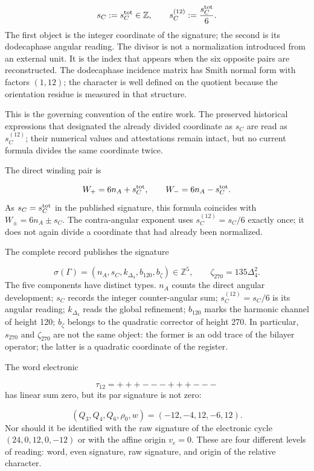 \[
s_C:=s_C^{\rm tot}\in\mathbb Z,
\qquad
s_C^{(12)}:=\frac{s_C^{\rm tot}}6.
\]
The first object is the integer coordinate of the signature; the second is its dodecaphase angular reading. The divisor is not a normalization introduced from an external unit. It is the index that appears when the six opposite pairs are reconstructed. The dodecaphase incidence matrix has Smith normal form with factors \((1,12)\); the character is well defined on the quotient because the orientation residue is measured in that structure.

This is the governing convention of the entire work. The preserved historical expressions that designated the already divided coordinate as \(s_C\) are read as \(s_C^{(12)}\); their numerical values and attestations remain intact, but no current formula divides the same coordinate twice.

The direct winding pair is

\[
W_+=6n_A+s_C^{\rm tot},
\qquad
W_-=6n_A-s_C^{\rm tot}.
\]
As \(s_C=s_C^{\rm tot}\) in the published signature, this formula coincides with \(W_\pm=6n_A\pm s_C\). The contra-angular exponent uses \(s_C^{(12)}=s_C/6\) exactly once; it does not again divide a coordinate that had already been normalized.

The complete record publishes the signature

\[
\sigma(\Gamma)=
(n_A,s_C,k_{\Delta_4},b_{120},b_\zeta)\in\mathbb Z^5,
\qquad
\zeta_{270}=135\Delta_4^2.
\]
The five components have distinct types. \(n_A\) counts the direct angular development; \(s_C\) records the integer counter-angular sum; \(s_C^{(12)}=s_C/6\) is its angular reading; \(k_{\Delta_4}\) reads the global refinement; \(b_{120}\) marks the harmonic channel of height 120; \(b_\zeta\) belongs to the quadratic corrector of height 270. In particular, \(s_{270}\) and \(\zeta_{270}\) are not the same object: the former is an odd trace of the bilayer operator; the latter is a quadratic coordinate of the register.

The word electronic

\[
\tau_{12}=+++---+++---
\]
has linear sum zero, but its par signature is not zero:

\[
(Q_3,Q_4,Q_6,\rho_0,w)=(-12,-4,12,-6,12).
\]
Nor should it be identified with the raw signature of the electronic cycle
\((24,0,12,0,-12)\) or with the affine origin \(v_e=0\). These are four
different levels of reading: word, even signature, raw signature, and
origin of the relative character.

